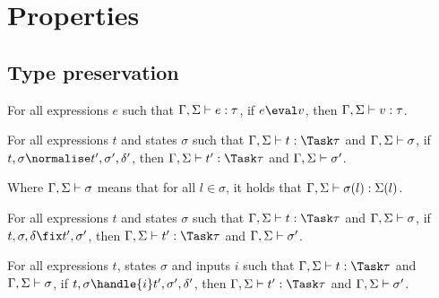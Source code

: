 
\section{Properties}
\label{sec:properties}


\subsection{Type preservation}
\label{sub:preservation}

\begin{theorem}
  For all expressions $e$
  such that $\Gamma,\Sigma \vdash e:\tau$,
  if $e\eval v$,
  then $\Gamma,\Sigma \vdash v:\tau$.
  \label{thm:pres-eval}
\end{theorem}



\begin{theorem}
  For all expressions $t$ and states $\sigma$
  such that $\Gamma,\Sigma \infers t:\Task\tau$ and $\Gamma,\Sigma \vdash \sigma$,
  if $t,\sigma \normalise t',\sigma',\delta'$,
  then $\Gamma,\Sigma \infers t':\Task\tau$ and $\Gamma,\Sigma \vdash \sigma'$.
  \label{thm:pres-norm}
\end{theorem}

\noindent
Where $\Gamma,\Sigma \vdash \sigma$ means that for all $l\in \sigma$, it holds that
$\Gamma,\Sigma\vdash \sigma(l):\Sigma(l)$.


\begin{theorem}
  For all expressions $t$ and states $\sigma$
  such that $\Gamma,\Sigma \infers t:\Task\tau$ and $\Gamma,\Sigma \vdash \sigma$,
  if $t,\sigma,\delta \fix t',\sigma'$,
  then $\Gamma,\Sigma \infers t':\Task\tau$ and $\Gamma,\Sigma \vdash \sigma'$.
  \label{thm:pres-fix}
\end{theorem}

\begin{theorem}
  For all expressions $t$, states $\sigma$ and inputs $i$
  such that $\Gamma,\Sigma \infers t:\Task\tau$ and $\Gamma,\Sigma \vdash \sigma$,
  if $ t,\sigma \handle{i} t',\sigma',\delta'$,
  then $\Gamma,\Sigma\infers t':\Task\tau$ and $\Gamma,\Sigma\vdash \sigma'$.
  \label{thm:pres-handle}
\end{theorem}

